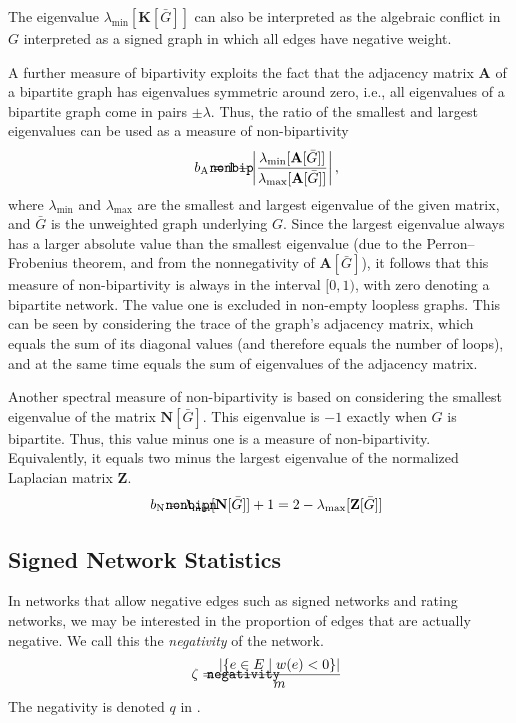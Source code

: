 \documentclass{article}
\def\mathnote#1{%
  \tag*{\rlap{\hspace\marginparsep\smash{\parbox[t]{\marginparwidth}{#1}}}}
}
\begin{document}
The eigenvalue $\lambda_{\min}[\mathbf K[\bar G]]$ can also be
interpreted as the algebraic conflict in $G$ interpreted as a signed
graph in which all edges have negative weight.

A further measure of bipartivity exploits the fact that the adjacency
matrix $\mathbf A$ of a bipartite graph has eigenvalues symmetric around
zero, i.e., all eigenvalues of a bipartite graph come in pairs $\pm
\lambda$. Thus, the ratio of the smallest and largest eigenvalues can be
used as a measure of non-bipartivity
\begin{align}
  \mathnote{\texttt{nonbip}} b_{\mathrm A} &= 1 - \left| \frac
             {\lambda_{\min}[\mathbf A[\bar G]]} {\lambda_{\max}[\mathbf
                 A[\bar G]]} \right|,
\end{align}
where $\lambda_{\min}$ and $\lambda_{\max}$ are the smallest and largest
eigenvalue of the given matrix, and $\bar G$ is the unweighted graph
underlying $G$.  Since the largest eigenvalue always has a larger
absolute value than the smallest eigenvalue (due to the
Perron--Frobenius theorem, and from the nonnegativity of $\mathbf A[\bar
  G]$), it follows that this measure of non-bipartivity is always in the
interval $[0,1)$, with zero denoting a bipartite network.  The value one
is excluded in non-empty loopless graphs.  This can be seen by
considering the trace of the graph's adjacency matrix, which equals the
sum of its diagonal values (and therefore equals the number of loops),
and at the same time equals the sum of eigenvalues of the adjacency
matrix. 

Another spectral measure of non-bipartivity is based on considering the
smallest eigenvalue of the matrix $\mathbf N[\bar G]$.  This eigenvalue
is $-1$ exactly when $G$ is bipartite.  Thus, this value minus one is a
measure of non-bipartivity. Equivalently, it equals two minus the
largest eigenvalue of the normalized Laplacian matrix $\mathbf Z$.
\begin{align}
  \mathnote{\texttt{nonbipn}} b_{\mathrm N} &= \lambda_{\min}[\mathbf
    N[\bar G]] + 1 = 2 - \lambda_{\max}[\mathbf Z[\bar G]]
\end{align}

\subsection{Signed Network Statistics}
In networks that allow negative edges such as signed networks and rating
networks, we may be interested in the proportion of edges that are
actually negative.  We call this the \emph{negativity} of the network. 
\begin{align}
  \mathnote{\texttt{negativity}}
  \zeta &= \frac { | \{ e \in E \mid w(e) < 0 \} | } {m}
\end{align}
The negativity is denoted $q$ in \citep{b868}. 
\end{document}
